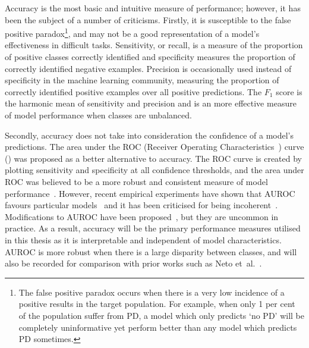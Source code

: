 \documentclass[12pt, twoside]{book}
\renewcommand\emph[1]{\textit{\color{USred}{#1}}}
\begin{document}
Accuracy is the most basic and intuitive measure of performance; however, it has been the subject of a number of criticisms. Firstly, it is susceptible to the false positive paradox\footnote{The false positive paradox occurs when there is a very low incidence of a positive results in the target population. For example, when only 1 per cent of the population suffer from PD, a model which only predicts `no PD' will be completely uninformative yet perform better than any model which predicts PD sometimes.}, and may not be a good representation of a model's effectiveness in difficult tasks. Sensitivity, or recall, is a measure of the proportion of positive classes correctly identified and specificity measures the proportion of correctly identified negative examples. Precision is occasionally used instead of specificity in the machine learning community, measuring the proportion of correctly identified positive examples over all positive predictions. The $F_1$ score is the harmonic mean of sensitivity and precision and is an more effective measure of model performance when classes are unbalanced. 


Secondly, accuracy does not take into consideration the confidence of a model's predictions. The area under the ROC (Receiver Operating Characteristics~\cite{rocauc}) curve (\emph{AUROC}) was proposed as a better alternative to accuracy. The ROC curve is created by plotting sensitivity and specificity at all confidence thresholds, and the area under ROC was believed to be a more robust and consistent measure of model performance~\cite{aucgood}. However, recent empirical experiments have shown that AUROC favours particular models~\cite{aucmislead2} and it has been criticised for being incoherent~\cite{aucmislead, aucincoherent}. Modifications to AUROC have been proposed~\cite{aucmislead2, aucincoherent}, but they are uncommon in practice. As a result, accuracy will be the primary performance measures utilised in this thesis as it is interpretable and independent of model characteristics. AUROC is more robust when there is a large disparity between classes, and will also be recorded for comparison with prior works such as Neto et~al.~\cite{mpowerneto2017analysis}.
\end{document}

